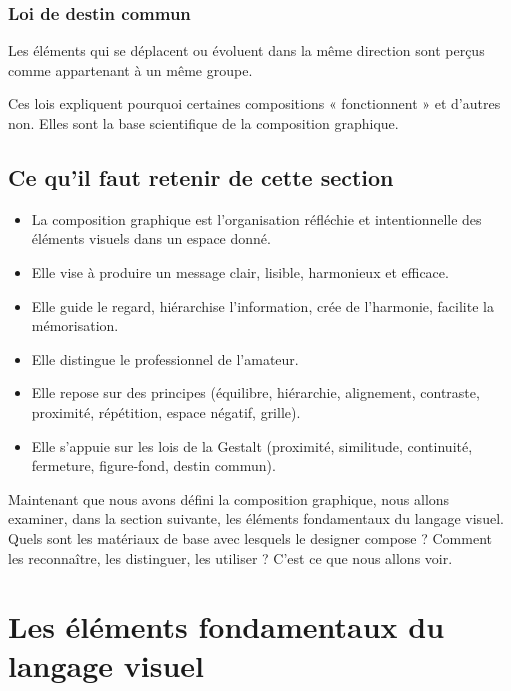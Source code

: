 \subsubsection{Loi de destin commun}

Les éléments qui se déplacent ou évoluent dans la même direction sont perçus comme appartenant à un même groupe.

Ces lois expliquent pourquoi certaines compositions « fonctionnent » et d'autres non. Elles sont la base scientifique de la composition graphique.

\subsection{Ce qu'il faut retenir de cette section}

\begin{retenir}
\begin{itemize}
  \item La composition graphique est l'organisation réfléchie et intentionnelle des éléments visuels dans un espace donné.
  \item Elle vise à produire un message clair, lisible, harmonieux et efficace.
  \item Elle guide le regard, hiérarchise l'information, crée de l'harmonie, facilite la mémorisation.
  \item Elle distingue le professionnel de l'amateur.
  \item Elle repose sur des principes (équilibre, hiérarchie, alignement, contraste, proximité, répétition, espace négatif, grille).
  \item Elle s'appuie sur les lois de la Gestalt (proximité, similitude, continuité, fermeture, figure-fond, destin commun).
\end{itemize}
\end{retenir}

Maintenant que nous avons défini la composition graphique, nous allons examiner, dans la section suivante, les éléments fondamentaux du langage visuel. Quels sont les matériaux de base avec lesquels le designer compose ? Comment les reconnaître, les distinguer, les utiliser ? C'est ce que nous allons voir.

\section{Les éléments fondamentaux du langage visuel}

